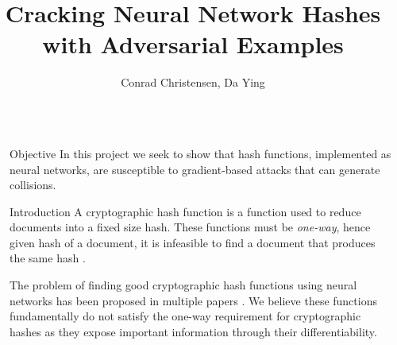 \documentclass[final]{beamer}
\title{Cracking Neural Network Hashes with Adversarial Examples}
\author{Conrad Christensen, Da Ying}
\institute{Computer Science, New York University} %
\newlength{\sepwid}
\newlength{\onecolwid}
\begin{document}

\setlength{\belowcaptionskip}{2ex} %
\setlength\belowdisplayshortskip{2ex} %

\begin{frame}[t] %

\begin{columns}[t] %

\begin{column}{\sepwid}\end{column} %

\begin{column}{\onecolwid} %


\begin{alertblock}{Objective}
    In this project we seek to show that hash functions, implemented as neural
    networks, are susceptible to gradient-based attacks that can generate 
    collisions.
\end{alertblock}


\begin{block}{Introduction}
    A cryptographic hash function is a function used to
    reduce documents into a fixed size hash.
    These functions
    must be \emph{one-way}, hence given hash of a document, it is infeasible to find a document
    that produces the same hash \cite{crypoHash}.  

    The problem of finding good cryptographic hash functions using neural networks has
    been proposed in multiple papers \cite{hash1, hash2}. We believe these
    functions fundamentally do not satisfy the one-way requirement for
    cryptographic hashes as they expose important information through their
    differentiability.
\end{block}


\end{column}
\end{columns}
\end{frame}
\end{document}
